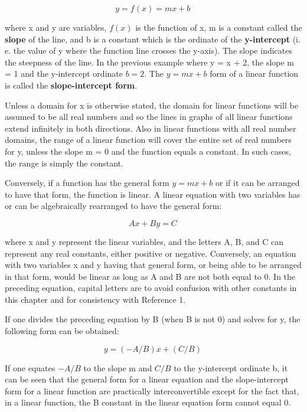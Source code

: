 $$y = f(x) = m x + b \,$$



where x and y are variables, $f(x)$ is the function of x, m is a constant called the
\textbf{slope} of the line, and b is a constant which is the ordinate of the
\textbf{y-intercept} (i. e. the value of y where the function line crosses the y-axis).
The slope indicates the steepness of the line. In the previous example where y = x + 2,
the slope m = 1 and the y-intercept ordinate $b = 2$. The $y = mx+b$ form of a linear
function is called the \textbf{slope-intercept form}.



Unless a domain for x is otherwise stated, the domain for linear functions will be assumed
to be all real numbers and so the lines in graphs of all linear functions extend
infinitely in both directions. Also in linear functions with all real number domains, the
range of a linear function will cover the entire set of real numbers for y, unless the
slope m = 0 and the function equals a constant. In such cases, the range is simply the
constant.



Conversely, if a function has the general form $y = mx + b$ or if it can be arranged to
have that form, the function is linear. A linear equation with two variables has or can be
algebraically rearranged to have the general form:



$$A x + B y = C \,$$



where x and y represent the linear variables, and the letters A, B, and C can represent
any real constants, either positive or negative. Conversely, an equation with two
variables x and y having that general form, or being able to be arranged in that form,
would be linear as long as A and B are not both equal to 0. In the preceding equation,
capital letters are to avoid confusion with other constants in this chapter and for
consistency with Reference 1.



If one divides the preceding equation by B (when B is not 0) and solves for y, the
following form can be obtained:



$$y = (-A/B) x + (C/B) \,$$



If one equates $-A/B$ to the slope m and $C/B$ to the y-intercept ordinate b, it can be
seen that the general form for a linear equation and the slope-intercept form for a linear
function are practically interconvertible except for the fact that, in a linear function,
the B constant in the linear equation form cannot equal 0.




